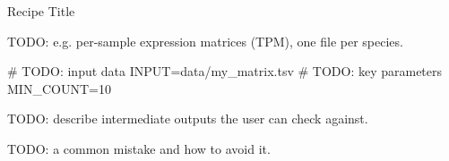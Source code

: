\begin{recipe}[label=rec:CHANGE_ME]{Recipe Title}


\nomaintainer

\begin{requiredinputs}
  \item TODO: e.g. per-sample expression matrices (TPM), one file per species.
\end{requiredinputs}

\begin{prerequisites}
\end{prerequisites}

\begin{workflow}
\end{workflow}


\begin{codefragment}[language=bash,caption={Edit the input paths and key options}]
# TODO: input data
INPUT=data/my_matrix.tsv
# TODO: key parameters
MIN_COUNT=10
\end{codefragment}

\begin{parameters}
\end{parameters}

\begin{expectedresults}
  TODO: describe intermediate outputs the user can check against.
\end{expectedresults}

\begin{pitfall}
  TODO: a common mistake and how to avoid it.
\end{pitfall}


\end{recipe}
